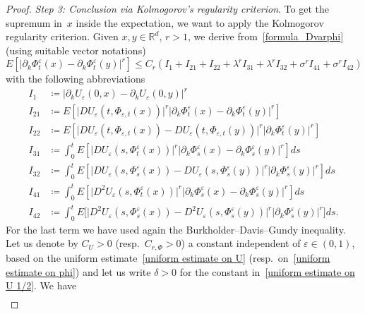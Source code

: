 \documentclass[a4paper,10pt]{article}
\newcommand\1{\mathbbm{1}}
\newcommand{\eps}{\varepsilon}
\numberwithin{equation}{section}
\begin{document}
\begin{proof}
\emph{Step 3: Conclusion via Kolmogorov's regularity criterion}. To get the supremum in~$x$ inside the expectation, we want to apply the Kolmogorov regularity criterion. Given $x,y\in\mathbb{R}^{d}$, $r>1$, we derive from~\eqref{formula_Dvarphi} (using suitable vector notations)
\begin{equation*}
E[  \vert \partial_{k}\Phi^{\eps}_{t}(x)
-\partial_{k}\Phi^{\eps}_{t}(  y)  \vert ^{r}]
\leq C_{r}(  I_{1}+I_{21}+I_{22}+\lambda^{r}I_{31}+\lambda^{r} 
I_{32}+\sigma^{r}I_{41}+\sigma^{r}I_{42})
\end{equation*}
with the following abbreviations
\begin{align*}
I_{1} & \coloneqq \vert \partial_{k}U_{\eps}(  0,x)  -\partial
_{k}U_{\eps}(  0,y)  \vert ^{r} \\[0.1cm]
I_{21}  & \coloneqq  E[  \vert DU_{\eps}(  t,\Phi_{\eps
,t}(x)  )  \vert ^{r}\vert \partial_{k} 
\Phi^{\eps}_{t}(x)  -\partial_{k}\Phi^{\eps}_{t}(
y)  \vert ^{r}]  \\[0.1cm]
I_{22}  & \coloneqq  E[  \vert DU_{\eps}(  t,\Phi_{\eps
,t}(x)  )  -DU_{\eps}(  t,\Phi_{\eps
,t}(  y)  )  \vert ^{r}\vert \partial_{k}
\Phi^{\eps}_{t}(  y)  \vert ^{r}] \\
I_{31}  & \coloneqq \int_{0}^{t}E[  \vert DU_{\eps}(  s,\Phi
^{\eps}_{t}(x)  )  \vert ^{r}\vert
\partial_{k}\Phi^{\eps}_{s}(x)  -\partial_{k}\Phi
^{\eps}_{s}(  y)  \vert ^{r}]  ds\\
I_{32}  & \coloneqq  \int_{0}^{t}E[  \vert DU_{\eps}(  s,\Phi
^{\eps}_{s}(x)  )  -DU_{\eps}(  s,\Phi
^{\eps}_{s}(  y)  )  \vert ^{r}\vert
\partial_{k}\Phi^{\eps}_{s}(  y)  \vert ^{r}]  ds \\
I_{41}  & \coloneqq \int_{0}^{t}E[  \vert D^{2}U_{\eps}(
s,\Phi^{\eps}_{t}(x)  )  \vert ^{r}\vert
\partial_{k}\Phi^{\eps}_{s}(x)  -\partial_{k}\Phi
^{\eps}_{s}(  y)  \vert ^{r}]  ds\\
I_{42}  & \coloneqq \int_{0}^{t}E\big[  \vert D^{2}U_{\eps}(
s,\Phi^{\eps}_{s}(x)  )  -D^{2}U_{\eps}(
s,\Phi^{\eps}_{s}(  y)  )  \vert ^{r}\vert
\partial_{k}\Phi^{\eps}_{s}(  y)  \vert ^{r}\big]  ds .
\end{align*}
For the last term we have used again the Burkholder--Davis--Gundy inequality. Let us denote by $C_{U}>0$ (resp.\ $C_{r,\Phi}>0$) a constant independent of $\eps \in (0,1)$, based on the uniform estimate~\eqref{uniform estimate on U} (resp.\ on~\eqref{uniform estimate on phi}) and let us write $\delta>0$ for the constant in~\eqref{uniform estimate on U 1/2}. We have
\begin{align*}

\end{align*}
\end{proof}
\end{document}
